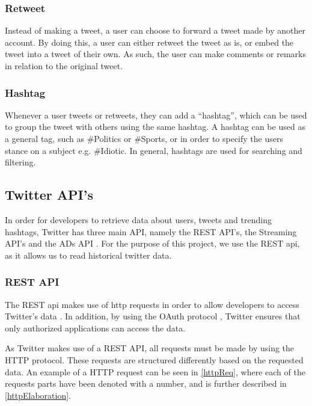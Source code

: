 \subsubsection{Retweet}
Instead of making a tweet, a user can choose to forward a tweet made by another
account. By doing this, a user can either retweet the tweet as is, or embed the
tweet into a tweet of their own. As such, the user can make comments or remarks
in relation to the original tweet.

\subsubsection{Hashtag}
Whenever a user tweets or retweets, they can add a ``hashtag'', which can be
used to group the tweet with others using the same hashtag. A hashtag can be
used as a general tag, such as \#Politics or \#Sports, or in order to specify
the users stance on a subject e.g. \#Idiotic. In general, hashtags are used for
searching and filtering.

\subsection{Twitter API's}
In order for developers to retrieve data about users, tweets and trending
hashtags, Twitter has three main API, namely the REST API's, the Streaming API's
and the ADs API \citep{TwitterDevDocs}. For the purpose of this project,
we use the REST api, as it allows us to read historical twitter
data.

\subsubsection{REST API}
The REST api makes use of http requests in order to allow developers to access
Twitter's data \citep{TwitterREST}. In addition, by using the OAuth protocol
\citep{TwitterOAuth}, Twitter ensures that only authorized applications can
access the data.\nl

As Twitter makes use of a REST API, all requests must be made by using the HTTP
protocol. These requests are structured differently based on the requested
data. An example of a HTTP request can be seen in \autoref{httpReq}, where each
of the requests parts have been denoted with a number, and is further described
in \autoref{httpElaboration}.


